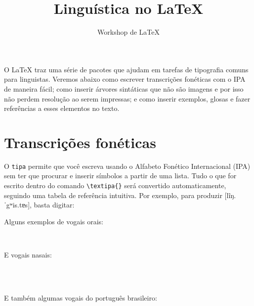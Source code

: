 \documentclass[11pt,a4paper,oneside]{article}
\title{Linguística no \LaTeX}
\author{Workshop de LaTeX}
\begin{document}
\frenchspacing

\maketitle

O LaTeX traz uma série de pacotes que ajudam em tarefas de tipografia comuns
para linguistas. Veremos abaixo como escrever transcrições fonéticas com o IPA
de maneira fácil; como inserir árvores sintáticas que não são imagens e por
isso não perdem resolução ao serem impressas; e como inserir exemplos, glosas e
fazer referências a esses elementos no texto.

\section{Transcrições fonéticas}

O \verb+tipa+ permite que você escreva usando o Alfabeto Fonético Internacional
(IPA) sem ter que procurar e inserir símbolos a partir de uma lista. Tudo o que
for escrito dentro do comando \verb+\textipa{}+ será convertido
automaticamente, seguindo uma tabela de referência intuitiva. Por exemplo, para
produzir [lĩŋ.ˈgʷis.tɐs], basta digitar:

\begin{center}
\end{center}

Alguns exemplos de vogais orais:

\begin{center}
  \textipa{[i e E a O o u]}\\
  \textipa{[I U 5]}
\end{center}

E vogais nasais:

\begin{center}
  \\
  \textipa{\~\textschwa}\\
\end{center}

E também algumas vogais do português brasileiro:

\begin{center}
  \begin{multicols}{2}
    \\
    \\
    \\
    \textipa{\textltailn}\\
    \\
    \textipa{\textfishhookr}\\
    \textipa{\textturnr}\\
    \\
  \end{multicols}
\end{center}
\end{document}
